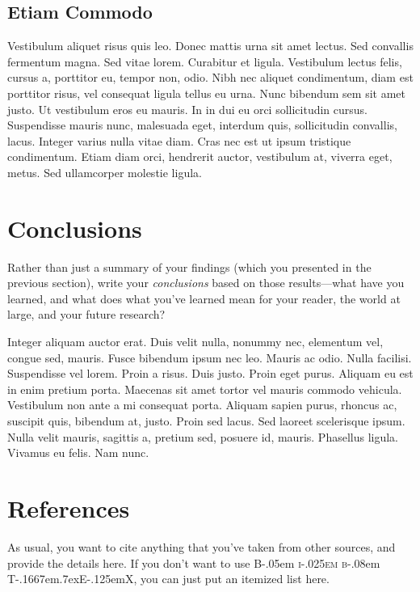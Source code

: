 \documentclass{hmcthesisposter}
\providecommand{\bibtex}{{\rmfamily B\kern-.05em%
    \textsc{i\kern-.025em b}\kern-.08em%
    T\kern-.1667em\lower.7ex\hbox{E}\kern-.125emX}}
\begin{document}
\begin{poster}
\subsection{Etiam Commodo}%
\label{sec:etiam-commodo}

Vestibulum aliquet risus quis leo. Donec mattis urna sit amet
lectus. Sed convallis fermentum magna. Sed vitae lorem. Curabitur et
ligula. Vestibulum lectus felis, cursus a, porttitor eu, tempor non,
odio. Nibh nec aliquet condimentum, diam est porttitor risus, vel
consequat ligula tellus eu urna. Nunc bibendum sem sit amet
justo. Ut vestibulum eros eu mauris. In in dui eu orci sollicitudin
cursus. Suspendisse mauris nunc, malesuada eget, interdum quis,
sollicitudin convallis, lacus. Integer varius nulla vitae diam. Cras
nec est ut ipsum tristique condimentum. Etiam diam orci, hendrerit
auctor, vestibulum at, viverra eget, metus. Sed ullamcorper molestie
ligula.


\section{Conclusions}

Rather than just a summary of your findings (which you presented in
the previous section), write your \emph{conclusions} based on those
results---what have you learned, and what does what you've learned
mean for your reader, the world at large, and your future research?

Integer aliquam auctor erat. Duis velit nulla, nonummy nec,
elementum vel, congue sed, mauris. Fusce bibendum ipsum nec
leo. Mauris ac odio. Nulla facilisi. Suspendisse vel lorem. Proin a
risus. Duis justo. Proin eget purus. Aliquam eu est in enim pretium
porta. Maecenas sit amet tortor vel mauris commodo
vehicula. Vestibulum non ante a mi consequat porta. Aliquam sapien
purus, rhoncus ac, suscipit quis, bibendum at, justo. Proin sed
lacus. Sed laoreet scelerisque ipsum. Nulla velit mauris, sagittis
a, pretium sed, posuere id, mauris. Phasellus ligula. Vivamus eu
felis. Nam nunc.




\section{References}

As usual, you want to cite anything that you've taken from other
sources, and provide the details here.  If you don't want to use
\bibtex, you can just put an itemized list here.


\end{poster}
\end{document}

